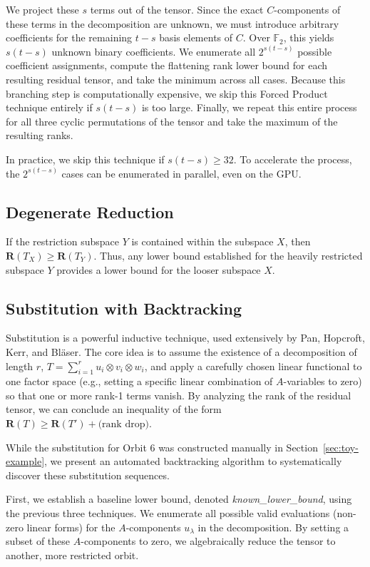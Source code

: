 \documentclass[11pt]{article}
\begin{document}
We project these $s$ terms out of the tensor. Since the exact $C$-components of these terms in the decomposition are unknown, we must introduce arbitrary coefficients for the remaining $t-s$ basis elements of $C$. Over $\mathbb{F}_2$, this yields $s(t-s)$ unknown binary coefficients. We enumerate all $2^{s(t-s)}$ possible coefficient assignments, compute the flattening rank lower bound for each resulting residual tensor, and take the minimum across all cases. Because this branching step is computationally expensive, we skip this Forced Product technique entirely if $s(t-s)$ is too large. Finally, we repeat this entire process for all three cyclic permutations of the tensor and take the maximum of the resulting ranks.

In practice, we skip this technique if $s(t-s) \ge 32$. To accelerate the process, the $2^{s(t-s)}$ cases can be enumerated in parallel, even on the GPU.

\subsection{Degenerate Reduction}
If the restriction subspace $Y$ is contained within the subspace $X$, then $\mathbf{R}(T_X) \ge \mathbf{R}(T_Y)$. Thus, any lower bound established for the heavily restricted subspace $Y$ provides a lower bound for the looser subspace $X$.

\subsection{Substitution with Backtracking}
Substitution is a powerful inductive technique, used extensively by Pan, Hopcroft, Kerr, and Bl{\"a}ser. The core idea is to assume the existence of a decomposition of length $r$, $T = \sum_{i=1}^{r} u_i \otimes v_i \otimes w_i$, and apply a carefully chosen linear functional to one factor space (e.g., setting a specific linear combination of $A$-variables to zero) so that one or more rank-1 terms vanish. By analyzing the rank of the residual tensor, we can conclude an inequality of the form $\mathbf{R}(T) \ge \mathbf{R}(T') + \text{(rank drop)}$.

While the substitution for Orbit 6 was constructed manually in Section~\ref{sec:toy-example}, we present an automated backtracking algorithm to systematically discover these substitution sequences.

First, we establish a baseline lower bound, denoted \textit{known\_lower\_bound}, using the previous three techniques. We enumerate all possible valid evaluations (non-zero linear forms) for the $A$-components $u_\lambda$ in the decomposition. By setting a subset of these $A$-components to zero, we algebraically reduce the tensor to another, more restricted orbit.
\end{document}
